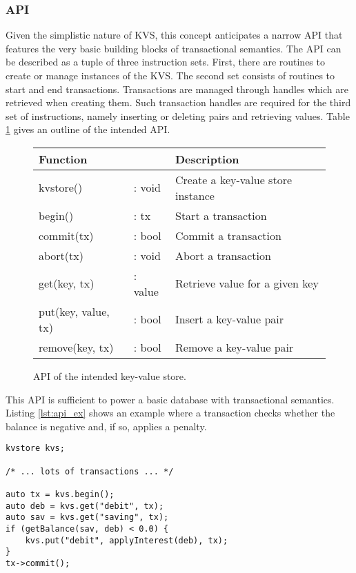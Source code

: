 \subsubsection{API}

Given the simplistic nature of \ac{KVS}, this concept anticipates a narrow
\ac{API} that features the very basic building blocks of transactional
semantics. The \ac{API} can be described as a tuple of three instruction sets.
First, there are routines to create or manage instances of the \ac{KVS}. The
second set consists of routines to start and end transactions. Transactions are
managed through handles which are retrieved when creating them. Such transaction
handles are required for the third set of instructions, namely inserting or
deleting pairs and retrieving values. Table \ref{tab:api} gives an outline of
the intended \ac{API}.

\begin{figure}[!h]
    \centering
    \begin{tabular}{|ll|l|}
        \hline
        \textbf{Function}          &  & \textbf{Description} \\
        \hline
        kvstore()           & : void  & Create a key-value store instance \\
        begin()             & : tx    & Start a transaction \\
        commit(tx)          & : bool  & Commit a transaction \\
        abort(tx)           & : void  & Abort a transaction \\
        get(key, tx)        & : value & Retrieve value for a given key \\
        put(key, value, tx) & : bool  & Insert a key-value pair \\
        remove(key, tx)     & : bool  & Remove a key-value pair \\
        \hline
    \end{tabular}
    \caption{API of the intended key-value store.}
    \label{tab:api}
\end{figure}

This \ac{API} is sufficient to power a basic database with transactional
semantics. Listing \ref{lst:api_ex} shows an example where a transaction checks
whether the balance is negative and, if so, applies a penalty.

\begin{lstlisting}[caption={}, captionpos=b, label=lst:api_ex]
kvstore kvs;

/* ... lots of transactions ... */

auto tx = kvs.begin();
auto deb = kvs.get("debit", tx);
auto sav = kvs.get("saving", tx);
if (getBalance(sav, deb) < 0.0) {
	kvs.put("debit", applyInterest(deb), tx);
}
tx->commit();
\end{lstlisting}


